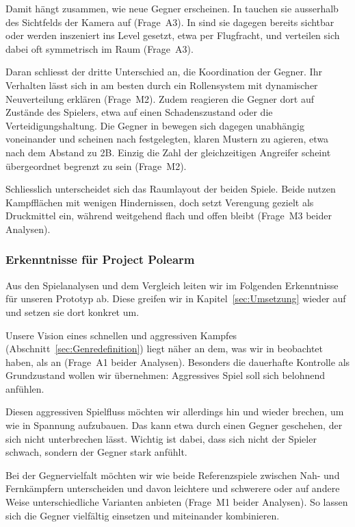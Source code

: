 \documentclass[../Main.tex]{subfiles}
\begin{document}
Damit hängt zusammen, wie neue Gegner erscheinen. In  tauchen sie ausserhalb des Sichtfelds der Kamera auf (Frage~A3). In  sind sie dagegen bereits sichtbar oder werden inszeniert ins Level gesetzt, etwa per Flugfracht, und verteilen sich dabei oft symmetrisch im Raum (Frage~A3).

Daran schliesst der dritte Unterschied an, die Koordination der Gegner. Ihr Verhalten lässt sich in  am besten durch ein Rollensystem mit dynamischer Neuverteilung erklären (Frage~M2). Zudem reagieren die Gegner dort auf Zustände des Spielers, etwa auf einen Schadenszustand oder die Verteidigungshaltung. Die Gegner in  bewegen sich dagegen unabhängig voneinander und scheinen nach festgelegten, klaren Mustern zu agieren, etwa nach dem Abstand zu 2B. Einzig die Zahl der gleichzeitigen Angreifer scheint übergeordnet begrenzt zu sein (Frage~M2).

Schliesslich unterscheidet sich das Raumlayout der beiden Spiele. Beide nutzen Kampfflächen mit wenigen Hindernissen, doch  setzt Verengung gezielt als Druckmittel ein, während  weitgehend flach und offen bleibt (Frage~M3 beider Analysen).

\subsubsection{Erkenntnisse für Project Polearm} \label{sec:ErkenntnisseRS}
Aus den Spielanalysen und dem Vergleich leiten wir im Folgenden Erkenntnisse für unseren Prototyp ab. Diese greifen wir in Kapitel~\ref{sec:Umsetzung} wieder auf und setzen sie dort konkret um.

Unsere Vision eines schnellen und aggressiven Kampfes (Abschnitt~\ref{sec:Genredefinition}) liegt näher an dem, was wir in  beobachtet haben, als an  (Frage~A1 beider Analysen). Besonders die dauerhafte Kontrolle als Grundzustand wollen wir übernehmen: Aggressives Spiel soll sich belohnend anfühlen.

Diesen aggressiven Spielfluss möchten wir allerdings hin und wieder brechen, um wie in  Spannung aufzubauen. Das kann etwa durch einen Gegner geschehen, der sich nicht unterbrechen lässt. Wichtig ist dabei, dass sich nicht der Spieler schwach, sondern der Gegner stark anfühlt.

Bei der Gegnervielfalt möchten wir wie beide Referenzspiele zwischen Nah- und Fernkämpfern unterscheiden und davon leichtere und schwerere oder auf andere Weise unterschiedliche Varianten anbieten (Frage~M1 beider Analysen). So lassen sich die Gegner vielfältig einsetzen und miteinander kombinieren.
\end{document}
